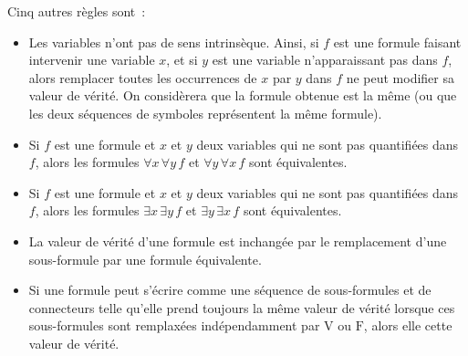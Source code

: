 Cinq autres règles sont :
\begin{itemize}
    \item Les variables n'ont pas de sens intrinsèque. 
    Ainsi, si $f$ est une formule faisant intervenir une variable $x$, et si $y$ est une variable n'apparaissant pas dans $f$, alors remplacer toutes les occurrences de $x$ par $y$ dans $f$ ne peut modifier sa valeur de vérité. 
    On considèrera que la formule obtenue est la même (ou que les deux séquences de symboles représentent la même formule). 
    \item Si $f$ est une formule et $x$ et $y$ deux variables qui ne sont pas quantifiées dans $f$, alors les formules $\forall x \, \forall y \, f$ et $\forall y \, \forall x \, f$ sont équivalentes.
    \item Si $f$ est une formule et $x$ et $y$ deux variables qui ne sont pas quantifiées dans $f$, alors les formules $\exists x \, \exists y \, f$ et $\exists y \, \exists x \, f$ sont équivalentes.
    \item La valeur de vérité d'une formule est inchangée par le remplacement d'une sous-formule par une formule équivalente.
    \item Si une formule peut s'écrire comme une séquence de sous-formules et de connecteurs telle qu'elle prend toujours la même valeur de vérité lorsque ces sous-formules sont remplaxées indépendamment par $\mathrm{V}$ ou $\mathrm{F}$, alors elle cette valeur de vérité.
\end{itemize}

